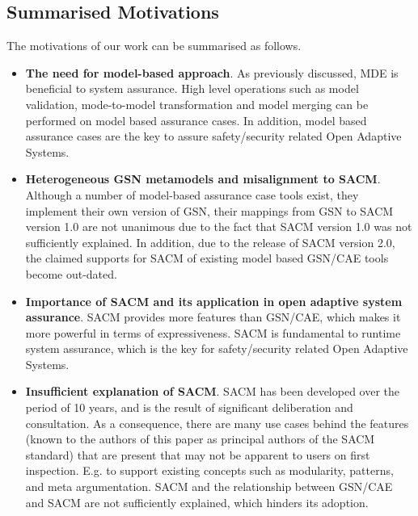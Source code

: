 \subsection{Summarised Motivations}
The motivations of our work can be summarised as follows. 
\begin{itemize}
	
	
	
	\item \textbf{The need for model-based approach}. 
	As previously discussed, MDE is beneficial to system assurance. 
	High level operations such as model validation, mode-to-model transformation and model merging can be performed on model based assurance cases. In addition, model based assurance cases are the key to assure safety/security related Open Adaptive Systems.
	\item \textbf{Heterogeneous GSN metamodels and misalignment to SACM}.
	Although a number of model-based assurance case tools exist, they implement their own version of GSN, their mappings from GSN to SACM version 1.0 are not unanimous due to the fact that SACM version 1.0 was not sufficiently explained. 
	In addition, due to the release of SACM version 2.0, the claimed supports for SACM of existing model based GSN/CAE tools become out-dated.
	\item \textbf{Importance of SACM and its application in open adaptive system assurance}. SACM provides more features than GSN/CAE, which makes it more powerful in terms of expressiveness. 
	SACM is fundamental to runtime system assurance, which is the key for safety/security related Open Adaptive Systems.
	\item \textbf{Insufficient explanation of SACM}. SACM has been developed over the period of 10 years, and is the result of significant deliberation and consultation. As a consequence, there are many use cases behind the features (known to the authors of this paper as principal authors of the SACM standard) that are present that may not be apparent to users on first inspection.
	E.g. to support existing concepts such as modularity, patterns, and meta argumentation. 
	SACM and the relationship between GSN/CAE and SACM are not sufficiently explained, which hinders its adoption. 
\end{itemize}
